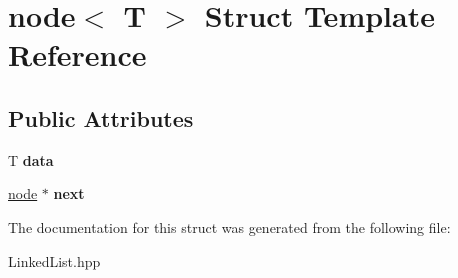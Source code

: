 \hypertarget{structnode}{}\section{node$<$ T $>$ Struct Template Reference}
\label{structnode}
\subsection*{Public Attributes}
\begin{DoxyCompactItemize}
\item 
\mbox{\label{structnode_a0a3e961e5caf1562f0c27caef3940e7a}} 
T {\bfseries data}
\item 
\mbox{\label{structnode_a7c8adb6c07d7574a94a1247285df4c29}} 
\mbox{\hyperlink{structnode}{node}} $\ast$ {\bfseries next}
\end{DoxyCompactItemize}


The documentation for this struct was generated from the following file\+:\begin{DoxyCompactItemize}
\item 
Linked\+List.\+hpp\end{DoxyCompactItemize}
